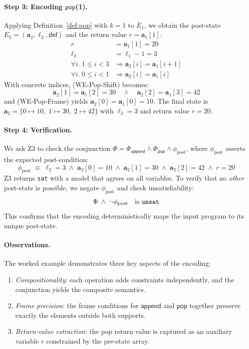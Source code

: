 \documentclass[11pt]{article}
\newcommand{\arrvar}[1]{\mathbf{a}_{#1}}
\newcommand{\lenvar}[1]{\ell_{#1}}
\newcommand{\defval}{\mathsf{def}}
\newcommand{\idx}{i}
\newcommand{\MutApp}{\ensuremath{\mathsf{append}}}
\newcommand{\MutPop}{\ensuremath{\mathsf{pop}}}
\begin{document}
\paragraph{Step 3: Encoding \MutPop(1).}
Applying Definition~\ref{def:pop} with $k = 1$ to $E_1$, we obtain the
post-state $E_2 = (\arrvar{2}, \lenvar{2}, \defval)$ and the return value
$r = \arrvar{1}[1]$:
\begin{align}
  r &= \arrvar{1}[1] = 20 \tag{WE-Pop-Ret}\\
  \lenvar{2} &= \lenvar{1} - 1 = 3 \tag{WE-Pop-Len}\\
  \forall \idx.\; 1 \leq \idx < 3
    &\Rightarrow \arrvar{2}[\idx] = \arrvar{1}[\idx + 1] \tag{WE-Pop-Shift}\\
  \forall \idx.\; 0 \leq \idx < 1
    &\Rightarrow \arrvar{2}[\idx] = \arrvar{1}[\idx] \tag{WE-Pop-Frame}
\end{align}
With concrete indices, (WE-Pop-Shift) becomes:
\[
  \arrvar{2}[1] = \arrvar{1}[2] = 30 \quad\wedge\quad
  \arrvar{2}[2] = \arrvar{1}[3] = 42
\]
and (WE-Pop-Frame) yields $\arrvar{2}[0] = \arrvar{1}[0] = 10$.  The final
state is $\arrvar{2} = \{0 \mapsto 10,\; 1 \mapsto 30,\; 2 \mapsto 42\}$
with $\lenvar{2} = 3$ and return value $r = 20$.

\paragraph{Step 4: Verification.}
We ask Z3 to check the conjunction
$\Phi = \Phi_{\MutApp} \wedge \Phi_{\MutPop} \wedge \phi_{\mathrm{post}}$,
where $\phi_{\mathrm{post}}$ asserts the expected post-condition:
\[
  \phi_{\mathrm{post}} \;\equiv\;
  \lenvar{2} = 3 \;\wedge\;
  \arrvar{2}[0] = 10 \;\wedge\;
  \arrvar{2}[1] = 30 \;\wedge\;
  \arrvar{2}[2] = 42 \;\wedge\;
  r = 20
\]
Z3 returns \texttt{sat} with a model that agrees on all variables.  To verify
that no \emph{other} post-state is possible, we negate $\phi_{\mathrm{post}}$
and check unsatisfiability:
\[
  \Phi \;\wedge\; \neg\phi_{\mathrm{post}} \quad\text{is \texttt{unsat}}
\]
This confirms that the encoding deterministically maps the input program to
its unique post-state.

\paragraph{Observations.}
The worked example demonstrates three key aspects of the encoding:
\begin{enumerate}[label=(\alph*),nosep]
  \item \emph{Compositionality}: each operation adds constraints
        independently, and the conjunction yields the composite semantics.
  \item \emph{Frame precision}: the frame conditions for \MutApp{} and
        \MutPop{} together preserve exactly the elements outside both
        supports.
  \item \emph{Return-value extraction}: the pop return value is captured
        as an auxiliary variable $r$ constrained by the pre-state array.
\end{enumerate}
\end{document}
